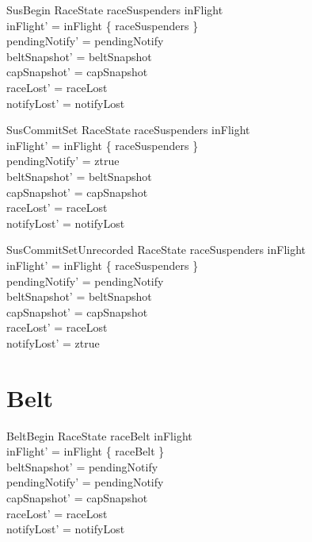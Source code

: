 \documentclass[a4paper,10pt,fleqn]{article}
\begin{document}
\begin{schema}{SusBegin}
  \Delta RaceState
  \where
  raceSuspenders \notin inFlight \\
  inFlight' = inFlight \cup \{ raceSuspenders \} \\
  pendingNotify' = pendingNotify \\
  beltSnapshot' = beltSnapshot \\
  capSnapshot' = capSnapshot \\
  raceLost' = raceLost \\
  notifyLost' = notifyLost
\end{schema}

\begin{schema}{SusCommitSet}
  \Delta RaceState
  \where
  raceSuspenders \in inFlight \\
  inFlight' = inFlight \setminus \{ raceSuspenders \} \\
  pendingNotify' = ztrue \\
  beltSnapshot' = beltSnapshot \\
  capSnapshot' = capSnapshot \\
  raceLost' = raceLost \\
  notifyLost' = notifyLost
\end{schema}

\begin{schema}{SusCommitSetUnrecorded}
  \Delta RaceState
  \where
  raceSuspenders \in inFlight \\
  inFlight' = inFlight \setminus \{ raceSuspenders \} \\
  pendingNotify' = pendingNotify \\
  beltSnapshot' = beltSnapshot \\
  capSnapshot' = capSnapshot \\
  raceLost' = raceLost \\
  notifyLost' = ztrue
\end{schema}

\section{Belt}

\begin{schema}{BeltBegin}
  \Delta RaceState
  \where
  raceBelt \notin inFlight \\
  inFlight' = inFlight \cup \{ raceBelt \} \\
  beltSnapshot' = pendingNotify \\
  pendingNotify' = pendingNotify \\
  capSnapshot' = capSnapshot \\
  raceLost' = raceLost \\
  notifyLost' = notifyLost
\end{schema}
\end{document}
